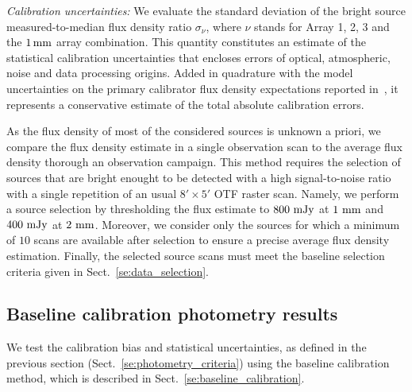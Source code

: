 \noindent \emph{Calibration uncertainties: }We evaluate the standard
deviation of the bright source measured-to-median flux density ratio
$\sigma_{\nu}$, where $\nu$ stands for Array 1, 2, 3 and the
$1\,\rm{mm}$ array combination. This quantity constitutes an estimate
of the statistical calibration uncertainties that encloses errors of
optical, atmospheric, noise and data processing origins.
Added in quadrature with the model uncertainties on the primary
calibrator flux density expectations reported
in~\citet{Morenothesis,Bendo2013}, %
it represents a conservative estimate of the total absolute
calibration errors.

As the flux density of most of the considered sources is unknown a priori, we
compare the flux density estimate in a single observation scan to the
average flux density thorough an observation campaign. This method
requires the selection of sources that are bright enought to be detected with a high
signal-to-noise ratio with a single repetition of an usual
$8'\times 5'$ OTF raster scan. Namely, we perform a source
selection by thresholding the flux estimate to $800~\rm{mJy}$ at
$1~\rm{mm}$ and $400~\rm{mJy}$ at $2~\rm{mm}$. Moreover, we consider
only the sources for which a minimum of $10$ scans are available after
selection to ensure a precise average flux density
estimation. Finally, the selected source scans must meet the baseline
selection criteria given in Sect.~\ref{se:data_selection}.


\subsection{Baseline calibration photometry results}
\label{se:photometry_baseline}

We test the calibration bias and statistical uncertainties, as defined
in the previous section (Sect.~\ref{se:photometry_criteria}) using the
baseline calibration method, which is described in
Sect.~\ref{se:baseline_calibration}.

